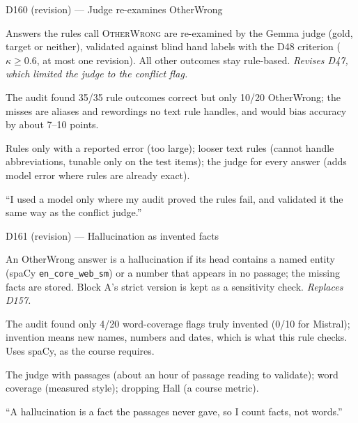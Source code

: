 \documentclass[11pt,a4paper]{report}
\begin{document}
\begin{decisionbox}{D160 (revision) --- Judge re-examines OtherWrong}
\begin{description}[nosep, leftmargin=0pt]
  \item[Decision.] Answers the rules call \textsc{OtherWrong} are re-examined by the Gemma judge (gold, target or neither), validated against blind hand labels with the D48 criterion ($\kappa \ge 0.6$, at most one revision). All other outcomes stay rule-based. \emph{Revises D47, which limited the judge to the conflict flag.}
  \item[Why.] The audit found 35/35 rule outcomes correct but only 10/20 OtherWrong; the misses are aliases and rewordings no text rule handles, and would bias accuracy by about 7--10 points.
  \item[Alternatives.] Rules only with a reported error (too large); looser text rules (cannot handle abbreviations, tunable only on the test items); the judge for every answer (adds model error where rules are already exact).
  \item[Interview line.] ``I used a model only where my audit proved the rules fail, and validated it the same way as the conflict judge.''
\end{description}
\end{decisionbox}

\begin{decisionbox}{D161 (revision) --- Hallucination as invented facts}
\begin{description}[nosep, leftmargin=0pt]
  \item[Decision.] An OtherWrong answer is a hallucination if its head contains a named entity (spaCy \texttt{en\_core\_web\_sm}) or a number that appears in no passage; the missing facts are stored. Block A's strict version is kept as a sensitivity check. \emph{Replaces D157.}
  \item[Why.] The audit found only 4/20 word-coverage flags truly invented (0/10 for Mistral); invention means new names, numbers and dates, which is what this rule checks. Uses spaCy, as the course requires.
  \item[Alternatives.] The judge with passages (about an hour of passage reading to validate); word coverage (measured style); dropping Hall (a course metric).
  \item[Interview line.] ``A hallucination is a fact the passages never gave, so I count facts, not words.''
\end{description}
\end{decisionbox}
\end{document}
